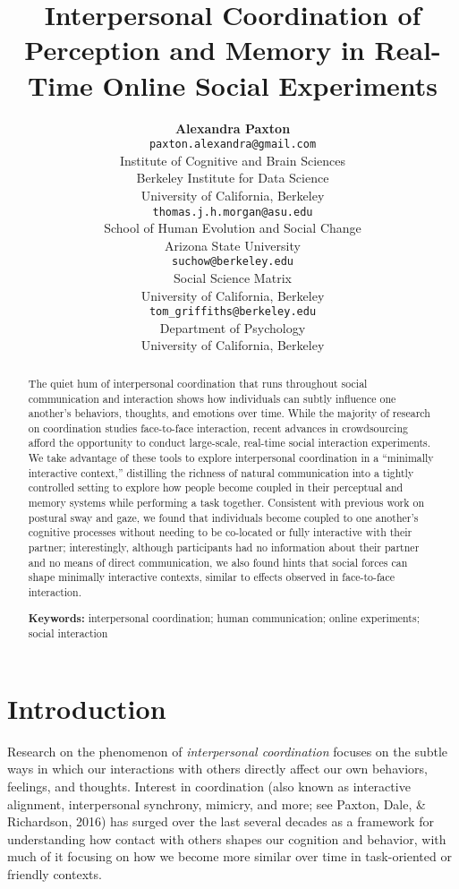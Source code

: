\documentclass[10pt, letterpaper]{article}
\title{Interpersonal Coordination of Perception and Memory in Real-Time Online
Social Experiments}
\author{{\large \bf Alexandra Paxton} \\ \texttt{paxton.alexandra@gmail.com} \\ Institute of Cognitive and Brain Sciences \\ Berkeley Institute for Data Science \\ University of California, Berkeley \And {\large \bf Thomas J. H. Morgan} \\ \texttt{thomas.j.h.morgan@asu.edu} \\ School of Human Evolution and Social Change \\ Arizona State University \AND {\large \bf Jordan W. Suchow} \\ \texttt{suchow@berkeley.edu} \\ Social Science Matrix \\ University of California, Berkeley \And {\large \bf Thomas L. Griffiths} \\ \texttt{tom\_griffiths@berkeley.edu} \\ Department of Psychology \\ University of California, Berkeley}
\begin{document}
\maketitle

\begin{abstract}
The quiet hum of interpersonal coordination that runs throughout social
communication and interaction shows how individuals can subtly influence
one another's behaviors, thoughts, and emotions over time. While the
majority of research on coordination studies face-to-face interaction,
recent advances in crowdsourcing afford the opportunity to conduct
large-scale, real-time social interaction experiments. We take advantage
of these tools to explore interpersonal coordination in a ``minimally
interactive context,'' distilling the richness of natural communication
into a tightly controlled setting to explore how people become coupled
in their perceptual and memory systems while performing a task together.
Consistent with previous work on postural sway and gaze, we found that
individuals become coupled to one another's cognitive processes without
needing to be co-located or fully interactive with their partner;
interestingly, although participants had no information about their
partner and no means of direct communication, we also found hints that
social forces can shape minimally interactive contexts, similar to
effects observed in face-to-face interaction.

\textbf{Keywords:}
interpersonal coordination; human communication; online experiments;
social interaction
\end{abstract}

\section{Introduction}\label{introduction}

Research on the phenomenon of \emph{interpersonal coordination} focuses
on the subtle ways in which our interactions with others directly affect
our own behaviors, feelings, and thoughts. Interest in coordination
(also known as interactive alignment, interpersonal synchrony, mimicry,
and more; see Paxton, Dale, \& Richardson, 2016) has surged over the
last several decades as a framework for understanding how contact with
others shapes our cognition and behavior, with much of it focusing on
how we become more similar over time in task-oriented or friendly
contexts.
\end{document}
